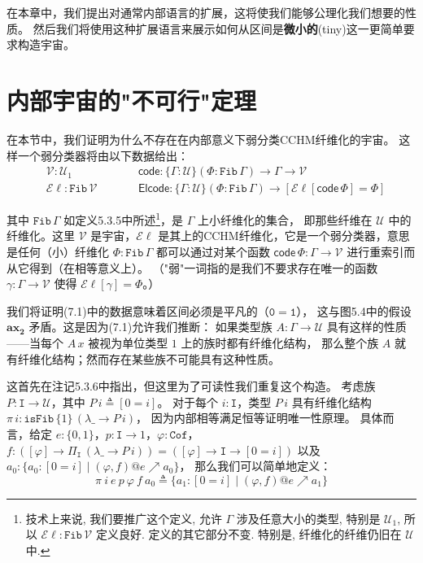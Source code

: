\documentclass{ctexrep}
\theoremstyle{plain}
\theoremstyle{definition}
\theoremstyle{remark}
\newcommand{\ttzero}{\mathtt{0}}
\newcommand{\ttone}{\mathtt{1}}
\newcommand{\ax}[1]{\mathbf{ax_{#1}}}
\begin{document}
在本章中，我们提出对通常内部语言的扩展，这将使我们能够公理化我们想要的性质。
然后我们将使用这种扩展语言来展示如何从区间是\textbf{微小的}(tiny)这一更简单要求构造宇宙。

\section{内部宇宙的"不可行"定理}

在本节中，我们证明为什么不存在在内部意义下弱分类CCHM纤维化的宇宙。
这样一个弱分类器将由以下数据给出：
\begin{equation}
\begin{aligned}
& \mathcal{V} : \mathcal{U}_1 \qquad && \mathsf{code} : \{\Gamma : \mathcal{U}\}(\Phi : \mathtt{Fib}\,\Gamma) \to \Gamma \to \mathcal{V} \\
& \mathcal{E}\!\ell : \mathtt{Fib}\,\mathcal{V} \qquad && \mathsf{Elcode} : \{\Gamma : \mathcal{U}\}(\Phi : \mathtt{Fib}\,\Gamma) \to [\mathcal{E}\!\ell[\mathsf{code}\,\Phi] = \Phi]
\end{aligned}
\end{equation}

其中 $\mathtt{Fib}\,\Gamma$ 如定义5.3.5中所述\footnote{技术上来说, 我们要推广这个定义, 允许 $\Gamma$ 涉及任意大小的类型, 特别是 $\mathcal{U}_1$, 所以 $\mathcal{E}\!\ell : \mathtt{Fib}\,\mathcal{V}$ 定义良好. 定义的其它部分不变. 特别是, 纤维化的纤维仍旧在 $\mathcal{U}$ 中.}，是 $\Gamma$ 上小纤维化的集合，
即那些纤维在 $\mathcal{U}$ 中的纤维化。这里 $\mathcal{V}$ 是宇宙，$\mathcal{E}\!\ell$ 是其上的CCHM纤维化，它是一个弱分类器，意思是任何（小）纤维化 $\Phi : \mathtt{Fib}\,\Gamma$ 都可以通过对某个函数 $\mathsf{code}\,\Phi : \Gamma \to \mathcal{V}$ 进行重索引而从它得到（在相等意义上）。
（"弱"一词指的是我们不要求存在唯一的函数 $\gamma : \Gamma \to \mathcal{V}$ 使得 
$\mathcal{E}\!\ell[\gamma] = \Phi$。）

我们将证明(7.1)中的数据意味着区间必须是平凡的（$\ttzero=\ttone$），
这与图5.4中的假设 $\ax{2}$ 矛盾。这是因为(7.1)允许我们推断：
如果类型族 $A : \Gamma \to \mathcal{U}$ 具有这样的性质——当每个 $A\,x$ 被视为单位类型 $1$ 上的族时都有纤维化结构，
那么整个族 $A$ 就有纤维化结构；然而存在某些族不可能具有这种性质。

这首先在注记5.3.6中指出，但这里为了可读性我们重复这个构造。
考虑族 $P : \mathtt{I} \to \mathcal{U}$，其中 $P\,i \triangleq [0=i]$。
对于每个 $i : \mathtt{I}$，类型 $P\,i$ 具有纤维化结构 
$\pi\,i : \mathtt{isFib}\,\{1\}\,(\lambda\_ \to P\,i)$，
因为内部相等满足恒等证明唯一性原理。
具体而言，给定 $e : \{0,1\}$，$p : \mathtt{I} \to 1$，$\varphi : \mathtt{Cof}$，
$f : ([\varphi] \to \Pi_\mathtt{I}\,(\lambda\_ \to P\,i)) = ([\varphi] \to \mathtt{I} \to [0=i])$
以及 $a_0 : \{a_0 : [0=i] \mid (\varphi,f)@e \nearrow a_0\}$，
那么我们可以简单地定义：
\[
\pi\ i\ e\ p\ \varphi\ f\ a_0 \triangleq \{a_1 : [0=i] \mid (\varphi,f)@e \nearrow a_1\}
\]
\end{document}
